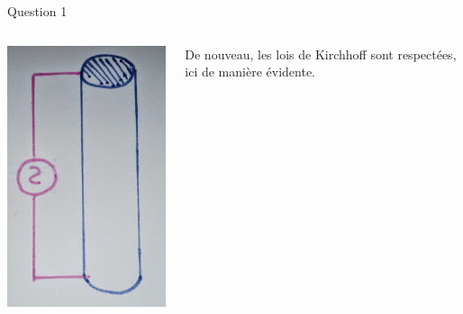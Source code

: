 \documentclass{beamer}
\begin{document}
\begin{frame}{Question 1}
	\begin{columns}
		\begin{column}{0.40\textwidth}
			\begin{center}
	    		\includegraphics[scale=0.2, angle=90]{Question1-2.png}
    		\end{center}
    	\end{column}
    	\begin{column}{0.40\textwidth}
	De nouveau, les lois de Kirchhoff sont respectées, ici de manière évidente.
    	\end{column}
	\end{columns}
\end{frame}
\end{document}
